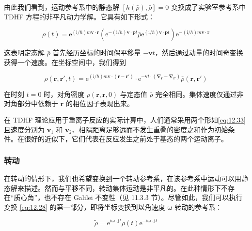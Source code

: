 由此我们看到，运动参考系中的静态解 $[h(\bar{\rho}),\bar{\rho}]=0$ 变换成了实验室参考系中 TDHF
方程的非平凡动力学解。它具有如下形式：

\begin{equation}
\rho(t)=\mathrm{e}^{(\mathrm{i}/\hbar)m\boldsymbol{v}\cdot\boldsymbol{r}}\left(\mathrm{e}^{-(\mathrm{i}/\hbar)\boldsymbol{v}\cdot\boldsymbol{p}t}\bar{\rho}\mathrm{e}^{(\mathrm{i}/\hbar)\boldsymbol{v}\cdot\boldsymbol{p}t}\right)\mathrm{e}^{-(\mathrm{i}/\hbar)m\boldsymbol{v}\cdot\boldsymbol{r}}\label{eq:12.32}
\end{equation}

这表明定态解 $\bar{\rho}$ 首先经历坐标的时间偶平移量 $-\boldsymbol{v}t$，然后通过动量的时间奇变换获得一个速度。在坐标空间中，我们得到

\begin{equation}
\rho(\boldsymbol{r},\boldsymbol{r}',t)=\mathrm{e}^{(\mathrm{i}/\hbar)m\boldsymbol{v}\cdot(\boldsymbol{r}-\boldsymbol{r}')}\cdot\mathrm{e}^{-\boldsymbol{v}t\cdot(\boldsymbol{\nabla}_{\boldsymbol{r}}+\boldsymbol{\nabla}_{\boldsymbol{r}'})}\bar{\rho}(\boldsymbol{r},\boldsymbol{r}')\label{eq:12.33}
\end{equation}

在时刻 $t=0$ 时，对角密度 $\rho(\boldsymbol{r},\boldsymbol{r},0)$ 与定态值 $\bar{\rho}$
完全相同。集体速度仅通过非对角部分中依赖于 $\boldsymbol{r}$ 的相位因子表现出来。

在 TDHF 理论应用于重离子反应的实际计算中，人们通常采用两个形如\ref{eq:12.33} 且速度分别为 $\boldsymbol{v}_{1}$
和 $\boldsymbol{v}_{2}$、相隔距离足够远而不发生重叠的密度之和作为初始条件。在很好的近似下，它们代表在反应发生之前处于基态的两个运动离子。

\subsubsection{转动\label{subsubsec:12.2.3.2}}

在转动的情形下，我们也希望变换到一个转动参考系，在该参考系中运动可以用静态解来描述。然而与平移不同，转动集体运动是非平凡的。在此种情形下不存在“质心角”，也不存在
Galilei 不变性（见 11.3.3 节）。尽管如此，我们可以执行变换 \ref{eq:12.28} 的第一部分，即将坐标变换到以角速度
$\boldsymbol{\omega}$ 转动的参考系：

\begin{equation}
\tilde{\rho}=\mathrm{e}^{\mathrm{i}\boldsymbol{\omega}\cdot\boldsymbol{j}t}\rho(t)\mathrm{e}^{-\mathrm{i}\boldsymbol{\omega}\cdot\boldsymbol{j}t}\label{eq:12.34}
\end{equation}


